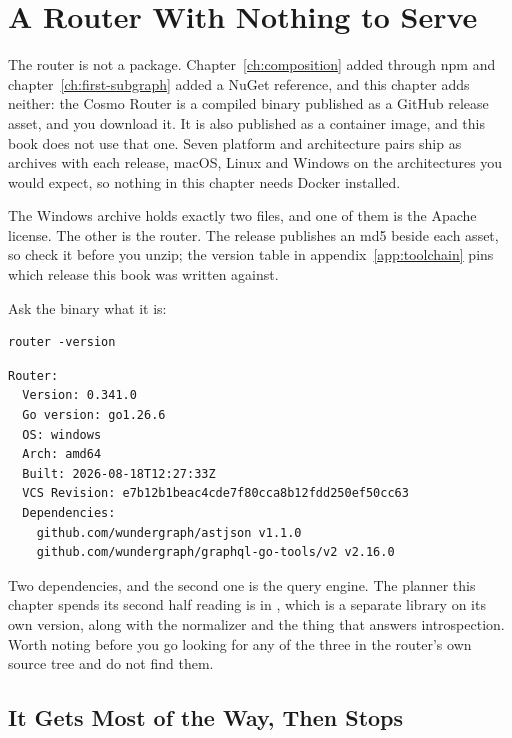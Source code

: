 \section{A Router With Nothing to Serve}
\label{sec:ch08-a-router-with-nothing-to-serve}

%
The router is not a package. Chapter~\ref{ch:composition} added 
through npm and chapter~\ref{ch:first-subgraph} added a NuGet reference, and
this chapter adds neither: the Cosmo Router is a compiled binary published as a
GitHub release asset, and you download it. It is also published as a container
image, and this book does not use that one. Seven platform and architecture
pairs ship as archives with each release, macOS, Linux and Windows on the
architectures you would expect, so nothing in this chapter needs Docker
installed.

%
The Windows archive holds exactly two files, and one of them is the Apache
license. The other is the router. The release publishes an md5 beside each
asset, so check it before you unzip; the version table in
appendix~\ref{app:toolchain} pins which release this book was written against.

%
Ask the binary what it is:

\begin{verbatim}
router -version
\end{verbatim}

\begin{verbatim}
Router:
  Version: 0.341.0
  Go version: go1.26.6
  OS: windows
  Arch: amd64
  Built: 2026-08-18T12:27:33Z
  VCS Revision: e7b12b1beac4cde7f80cca8b12fdd250ef50cc63
  Dependencies:
    github.com/wundergraph/astjson v1.1.0
    github.com/wundergraph/graphql-go-tools/v2 v2.16.0
\end{verbatim}

%
Two dependencies, and the second one is the query engine. The planner this
chapter spends its second half reading is in , which is
a separate library on its own version, along with the normalizer and the thing
that answers introspection. Worth noting before you go looking for any of the
three in the router's own source tree and do not find them.

\subsection{It Gets Most of the Way, Then Stops}

